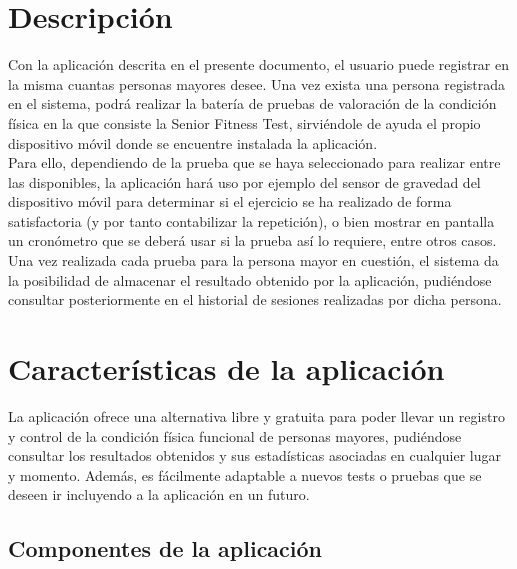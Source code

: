 

\section{Descripción}

Con la aplicación descrita en el presente documento, el usuario puede registrar en la misma cuantas personas mayores desee. Una vez exista una persona registrada en el sistema, podrá realizar la batería de pruebas de valoración de la condición física en la que consiste la Senior Fitness Test, sirviéndole de ayuda el propio dispositivo móvil donde se encuentre instalada la aplicación.\\

Para ello, dependiendo de la prueba que se haya seleccionado para realizar entre las disponibles, la aplicación hará uso por ejemplo del sensor de gravedad del dispositivo móvil para determinar si el ejercicio se ha realizado de forma satisfactoria (y por tanto contabilizar la repetición), o bien mostrar en pantalla un cronómetro que se deberá usar si la prueba así lo requiere, entre otros casos.\\

Una vez realizada cada prueba para la persona mayor en cuestión, el sistema da la posibilidad de almacenar el resultado obtenido por la aplicación, pudiéndose consultar posteriormente en el historial de sesiones realizadas por dicha persona.

\section{Características de la aplicación}

La aplicación ofrece una alternativa libre y gratuita para poder llevar un registro y control de la condición física funcional de personas mayores, pudiéndose consultar los resultados obtenidos y sus estadísticas asociadas en cualquier lugar y momento. Además, es fácilmente adaptable a nuevos tests o pruebas que se deseen ir incluyendo a la aplicación en un futuro.

\subsection{Componentes de la aplicación}

